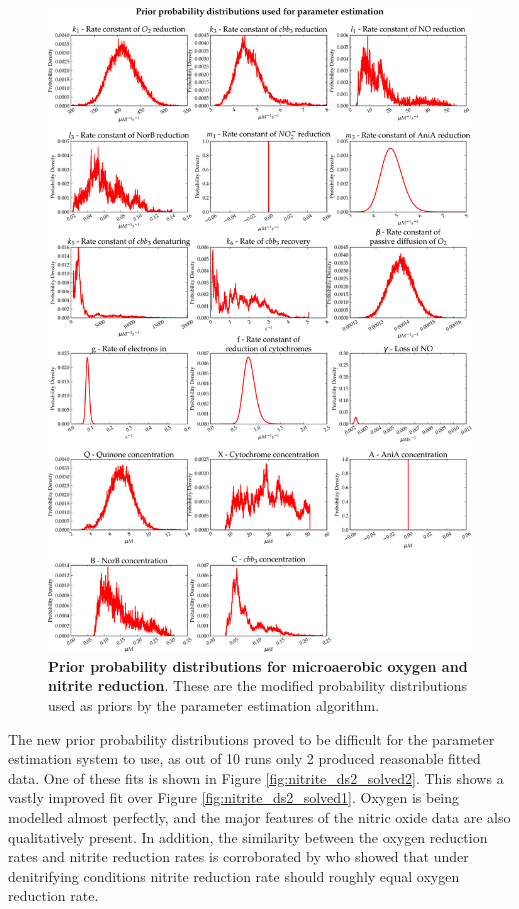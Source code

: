 \begin{figure}[tbp]
 \centering
 \includegraphics[width=15cm, trim=0cm 0cm 0cm 0cm, clip=true]{./07-nitritereduction/data/priors2.pdf}
 \caption[Prior probability distributions for microaerobic oxygen and nitrite reduction]{{\bf Prior probability distributions for microaerobic oxygen and nitrite reduction}. These are the modified probability distributions used as priors by the parameter estimation algorithm.
 \label{fig:nitrite_priors2}}
\end{figure}
\afterpage{\clearpage}

The new prior probability distributions proved to be difficult for the parameter estimation system to use, as out of 10 runs only 2 produced reasonable fitted data. One of these fits is shown in Figure \ref{fig:nitrite_ds2_solved2}. This shows a vastly improved fit over Figure \ref{fig:nitrite_ds2_solved1}. Oxygen is being modelled almost perfectly, and the major features of the nitric oxide data are also qualitatively present. In addition, the similarity between the oxygen reduction rates and nitrite reduction rates is corroborated by \citet{Rock2005} who showed that under denitrifying conditions nitrite reduction rate should roughly equal oxygen reduction rate.

